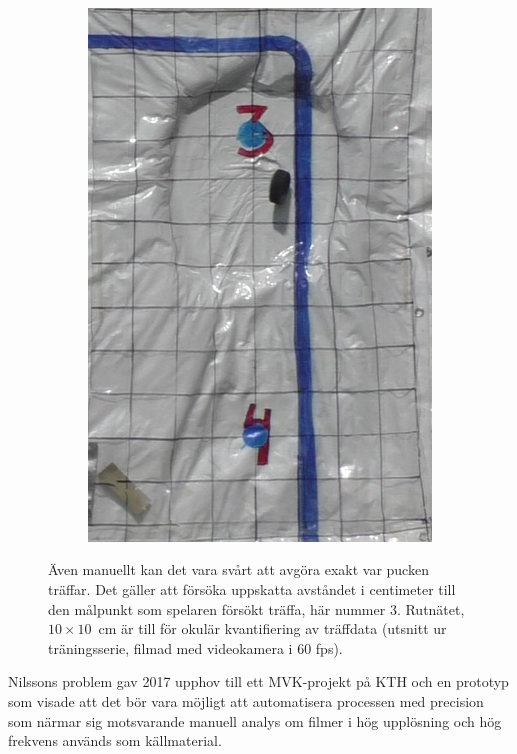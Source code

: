 \documentclass[a4paper,12pt]{article}
\begin{document}
\begin{figure}[ht]
\begin{subfigure}[t]{0.24\textwidth}
    \includegraphics[width=\linewidth]{photos/skott4.png}
  \end{subfigure}%

  \caption{Även manuellt kan det vara svårt att avgöra exakt var pucken
    träffar. Det gäller att försöka uppskatta avståndet i centimeter till
    den målpunkt som spelaren försökt träffa, här nummer 3. Rutnätet,
    $10 \times 10$~cm är till för okulär kvantifiering av träffdata (utsnitt
    ur träningsserie, filmad med videokamera i 60 fps).\label{fig:skott}}
\end{figure}

Nilssons problem gav 2017 upphov till ett MVK-projekt på KTH och en
prototyp som visade att det bör vara möjligt att automatisera processen med
precision som närmar sig motsvarande manuell analys om filmer i hög
upplösning och hög frekvens används som källmaterial.
\end{document}
